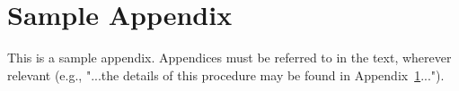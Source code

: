 \documentclass[DD]{iitmdiss}
\newcommand{\mref}[1]{\ref{#1}}
\newcommand{\mlabel}[1]{\label{#1}}
\begin{document}
\chapter{Sample Appendix}\mlabel{ch:appendix}
%
This is a sample appendix. Appendices must be referred to in the text, wherever relevant (e.g., "...the details of this procedure may be found in Appendix~\mref{ch:appendix}...").

\begin{singlespace}
  
\end{singlespace}


%
%
%
\end{document}
